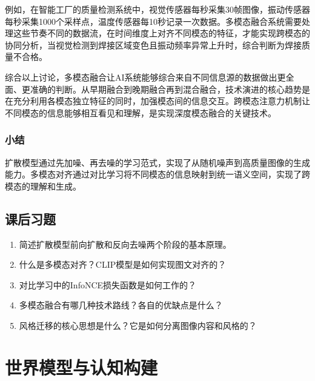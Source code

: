 例如，在智能工厂的质量检测系统中，视觉传感器每秒采集30帧图像，振动传感器每秒采集1000个采样点，温度传感器每10秒记录一次数据。多模态融合系统需要处理这些节奏不同的数据流，在时间维度上对齐不同模态的特征，才能实现跨模态的协同分析，当视觉检测到焊接区域变色且振动频率异常上升时，综合判断为焊接质量不合格。

综合以上讨论，多模态融合让AI系统能够综合来自不同信息源的数据做出更全面、更准确的判断。从早期融合到晚期融合再到混合融合，技术演进的核心趋势是在充分利用各模态独立特征的同时，加强模态间的信息交互。跨模态注意力机制让不同模态的信息能够相互看见和理解，是实现深度模态融合的关键技术。





\subsubsection*{小结}

扩散模型通过先加噪、再去噪的学习范式，实现了从随机噪声到高质量图像的生成能力。多模态对齐通过对比学习将不同模态的信息映射到统一语义空间，实现了跨模态的理解和生成。

\subsection*{课后习题}

\begin{enumerate}
\setlength{\itemsep}{6pt}
\item 简述扩散模型前向扩散和反向去噪两个阶段的基本原理。
\item 什么是多模态对齐？CLIP模型是如何实现图文对齐的？
\item 对比学习中的InfoNCE损失函数是如何工作的？
\item 多模态融合有哪几种技术路线？各自的优缺点是什么？
\item 风格迁移的核心思想是什么？它是如何分离图像内容和风格的？
\end{enumerate}


\newpage
\section{世界模型与认知构建}


